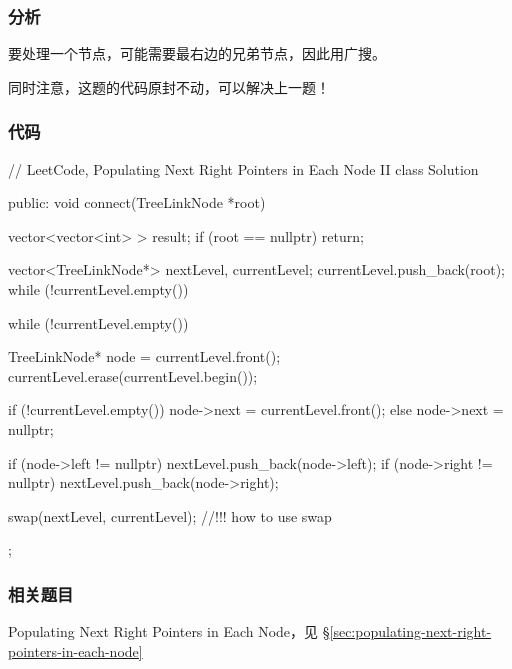 \subsubsection{分析}
要处理一个节点，可能需要最右边的兄弟节点，因此用广搜。

同时注意，这题的代码原封不动，可以解决上一题！

\subsubsection{代码}

\begin{Code}
// LeetCode, Populating Next Right Pointers in Each Node II
class Solution {
public:
    void connect(TreeLinkNode *root) {
        vector<vector<int> > result;
        if (root == nullptr)
            return;

        vector<TreeLinkNode*> nextLevel, currentLevel;
        currentLevel.push_back(root);
        while (!currentLevel.empty()) {
            while (!currentLevel.empty()) {
                TreeLinkNode* node = currentLevel.front();
                currentLevel.erase(currentLevel.begin());

                if (!currentLevel.empty())
                    node->next = currentLevel.front();
                else
                    node->next = nullptr;

                if (node->left != nullptr)
                    nextLevel.push_back(node->left);
                if (node->right != nullptr)
                    nextLevel.push_back(node->right);
            }
            swap(nextLevel, currentLevel); //!!! how to use swap
        }
    }
};
\end{Code}


\subsubsection{相关题目}
\begindot
\item Populating Next Right Pointers in Each Node，见 \S \ref{sec:populating-next-right-pointers-in-each-node}
\myenddot
